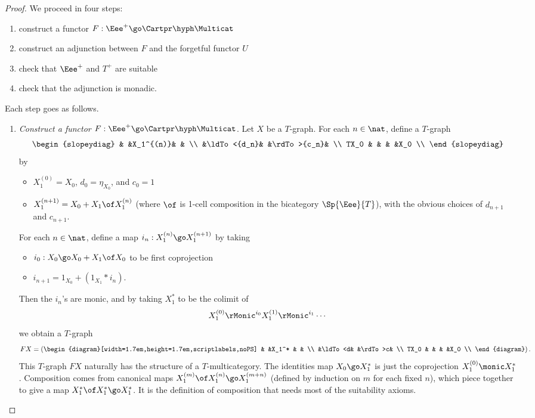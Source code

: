\begin{proof}
We proceed in four steps:
\begin{enumerate}
\item 	{}
construct a functor $F: \Eee^+ \go \Cartpr\hyph\Multicat$
\item 	%
construct an adjunction between $F$ and the forgetful functor $U$
\item 	%
check that $\Eee^+$ and $T^+$ are suitable
\item 	%
check that the adjunction is monadic.
\end{enumerate}
%
Each step goes as follows.
%
\begin{enumerate}
%
\item \emph{Construct a functor $F: \Eee^+ \go \Cartpr\hyph\Multicat$}.
Let $X$ be a $T$-graph.  For each $n\in\nat$, define a $T$-graph
\[
\begin{slopeydiag}
	&	&X_1^{(n)}&	&	\\
	&\ldTo<{d_n}&	&\rdTo>{c_n}&	\\
TX_0	&	&	&	&X_0	\\
\end{slopeydiag}
\]
by
%
\begin{itemize}
\item $X_1^{(0)}=X_0$, $d_0=\eta_{X_0}$, and $c_0=1$
\item $X_1^{(n+1)} = X_0 + X_1\of X_1^{(n)}$ (where $\of$ is 1-cell
composition in the bicategory $\Sp{\Eee}{T}$), with the obvious choices of
$d_{n+1}$ and $c_{n+1}$.
\end{itemize}
%
For each $n\in\nat$, define a map $i_n: X_1^{(n)} \go X_1^{(n+1)}$ by taking
%
\begin{itemize}
\item $i_0: X_0 \go X_0 + X_1 \of X_0$ to be first coprojection
\item $i_{n+1} = 1_{X_0} + (1_{X_1} * i_n)$.
\end{itemize}
%
Then the $i_n$'s are monic, and by taking $X_1^*$ to be the colimit of 
\[
X_1^{(0)} \rMonic^{i_0} X_1^{(1)} \rMonic^{i_1} \cdots
\]
we obtain a $T$-graph
\[
FX =
\left(
\begin{diagram}[width=1.7em,height=1.7em,scriptlabels,noPS]
	&	&X_1^*	&	&	\\
	&\ldTo<d&	&\rdTo>c&	\\
TX_0	&	&	&	&X_0	\\
\end{diagram}
\right).
\]
This $T$-graph $FX$ naturally has the structure of a $T$-multicategory.
The identities map $X_0 \go X_1^*$ is just the coprojection $X_1^{(0)}
\monic X_1^*$.  Composition comes from canonical maps $X_1^{(m)} \of
X_1^{(n)} \go X_1^{(m+n)}$ (defined by induction on $m$ for each fixed
$n$), which piece together to give a map $X_1^* \of X_1^* \go X_1^*$.  It
is the definition of composition that needs most of the suitability
axioms.


\end{enumerate}
\end{proof}
